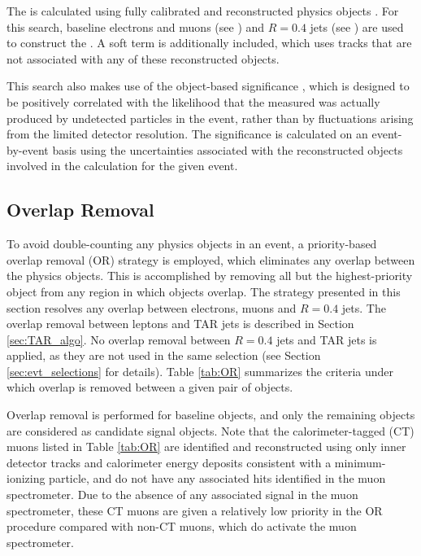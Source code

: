 The \met is calculated using fully calibrated and reconstructed physics objects \cite{PERF-2016-07}. For this search, baseline electrons and muons (see \Sect{\ref{sec:charged_leptons}}) and \(R=0.4\) jets (see \Sect{\ref{sec:atk4_jets}}) are used to construct the \met. A soft term is additionally included, which uses tracks that are not associated with any of these reconstructed objects. 

This search also makes use of the object-based \met significance \metsig \cite{ATLAS-CONF-2018-038}, which is designed to be positively correlated with the likelihood that the measured \met was actually produced by undetected particles in the event, rather than by fluctuations arising from the limited detector resolution. The \met significance is calculated on an event-by-event basis using the uncertainties associated with the reconstructed objects involved in the \met calculation for the given event.

\subsection{Overlap Removal}

To avoid double-counting any physics objects in an event, a priority-based overlap removal (OR) strategy is employed, which eliminates any overlap between the physics objects. This is accomplished by removing all but the highest-priority object from any region in which objects overlap. The strategy presented in this section resolves any overlap between electrons, muons and \(R=0.4\) \smallR jets. The overlap removal between leptons and TAR jets is described in Section \ref{sec:TAR_algo}. No overlap removal between \(R=0.4\) jets and TAR jets is applied, as they are not used in the same selection (see Section \ref{sec:evt_selections} for details). Table \ref{tab:OR} summarizes the criteria under which overlap is removed between a given pair of objects. 

Overlap removal is performed for baseline objects, and only the remaining objects are considered as candidate signal objects. Note that the calorimeter-tagged (CT) muons \cite{muon_reco} listed in Table \ref{tab:OR} are identified and reconstructed using only inner detector tracks and calorimeter energy deposits consistent with a minimum-ionizing particle, and do not have any associated hits identified in the muon spectrometer. Due to the absence of any associated signal in the muon spectrometer, these CT muons are given a relatively low priority in the OR procedure compared with non-CT muons, which do activate the muon spectrometer.

